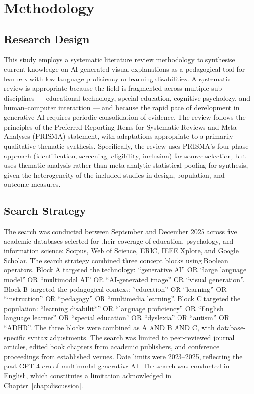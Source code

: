 %
%
\chapter{Methodology}
\label{chap:method}
\setlength{\parskip}{1em}
%
\section{Research Design}

This study employs a systematic literature review methodology to synthesise current knowledge on AI-generated visual explanations as a pedagogical tool for learners with low language proficiency or learning disabilities. A systematic review is appropriate because the field is fragmented across multiple sub-disciplines --- educational technology, special education, cognitive psychology, and human--computer interaction --- and because the rapid pace of development in generative AI requires periodic consolidation of evidence. The review follows the principles of the Preferred Reporting Items for Systematic Reviews and Meta-Analyses (PRISMA) statement, with adaptations appropriate to a primarily qualitative thematic synthesis. Specifically, the review uses PRISMA's four-phase approach (identification, screening, eligibility, inclusion) for source selection, but uses thematic analysis rather than meta-analytic statistical pooling for synthesis, given the heterogeneity of the included studies in design, population, and outcome measures.

\section{Search Strategy}

The search was conducted between September and December 2025 across five academic databases selected for their coverage of education, psychology, and information science: Scopus, Web of Science, ERIC, IEEE Xplore, and Google Scholar. The search strategy combined three concept blocks using Boolean operators. Block A targeted the technology: ``generative AI'' OR ``large language model'' OR ``multimodal AI'' OR ``AI-generated image'' OR ``visual generation''. Block B targeted the pedagogical context: ``education'' OR ``learning'' OR ``instruction'' OR ``pedagogy'' OR ``multimedia learning''. Block C targeted the population: ``learning disabilit*'' OR ``language proficiency'' OR ``English language learner'' OR ``special education'' OR ``dyslexia'' OR ``autism'' OR ``ADHD''. The three blocks were combined as A AND B AND C, with database-specific syntax adjustments. The search was limited to peer-reviewed journal articles, edited book chapters from academic publishers, and conference proceedings from established venues. Date limits were 2023--2025, reflecting the post-GPT-4 era of multimodal generative AI. The search was conducted in English, which constitutes a limitation acknowledged in Chapter~\ref{chap:discussion}.

